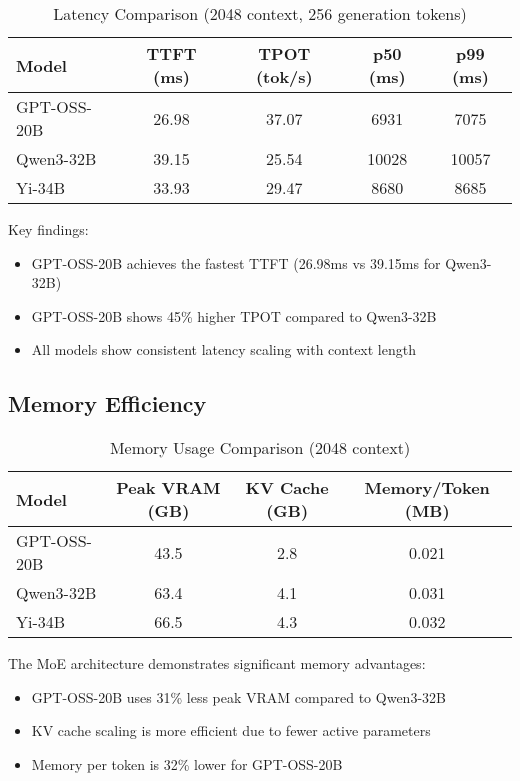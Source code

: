 \documentclass[11pt]{article}
\begin{document}
\begin{table}[h]
\centering
\caption{Latency Comparison (2048 context, 256 generation tokens)}
\begin{tabular}{lcccc}
\toprule
Model & TTFT (ms) & TPOT (tok/s) & p50 (ms) & p99 (ms) \\
\midrule
GPT-OSS-20B & 26.98 & 37.07 & 6931 & 7075 \\
Qwen3-32B & 39.15 & 25.54 & 10028 & 10057 \\
Yi-34B & 33.93 & 29.47 & 8680 & 8685 \\
\bottomrule
\end{tabular}
\end{table}

Key findings:
\begin{itemize}
    \item GPT-OSS-20B achieves the fastest TTFT (26.98ms vs 39.15ms for Qwen3-32B)
    \item GPT-OSS-20B shows 45\% higher TPOT compared to Qwen3-32B
    \item All models show consistent latency scaling with context length
\end{itemize}

\subsection{Memory Efficiency}

\begin{table}[h]
\centering
\caption{Memory Usage Comparison (2048 context)}
\begin{tabular}{lccc}
\toprule
Model & Peak VRAM (GB) & KV Cache (GB) & Memory/Token (MB) \\
\midrule
GPT-OSS-20B & 43.5 & 2.8 & 0.021 \\
Qwen3-32B & 63.4 & 4.1 & 0.031 \\
Yi-34B & 66.5 & 4.3 & 0.032 \\
\bottomrule
\end{tabular}
\end{table}

The MoE architecture demonstrates significant memory advantages:
\begin{itemize}
    \item GPT-OSS-20B uses 31\% less peak VRAM compared to Qwen3-32B
    \item KV cache scaling is more efficient due to fewer active parameters
    \item Memory per token is 32\% lower for GPT-OSS-20B
\end{itemize}
\end{document}
